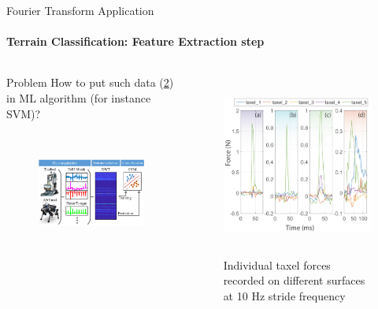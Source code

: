 \documentclass[aspectratio=169]{beamer}
\begin{document}
\begin{frame}[t]{Fourier Transform Application}
\framesubtitle{Terrain Classification: Feature Extraction step}
\vspace{-0.6cm}
\begin{columns}[T,onlytextwidth]
    \begin{column}{0.59\textwidth}
        \begin{block}{Problem}
            How to put such data (\ref{fig:Force_data_from_robot.png}) in ML algorithm (for instance SVM)?
        \end{block}
        \vspace{-0.5cm}
        \begin{figure}[H]
            \centering\includegraphics[height=4cm,width=1\textwidth,keepaspectratio]{TC_algo.png}
            \label{fig:TC_algo.png}
        \end{figure}
    \end{column}
    \begin{column}{0.39\textwidth}
        \vspace{-0.75cm}
        \begin{figure}[H]
            \centering\includegraphics[height=6cm,width=1\textwidth,keepaspectratio]{Force_data_from_robot.png}
            \caption{Individual taxel forces recorded on different surfaces at 10 Hz stride frequency}
            \label{fig:Force_data_from_robot.png}
        \end{figure}
    \end{column}
\end{columns}
\end{frame}
\end{document}
